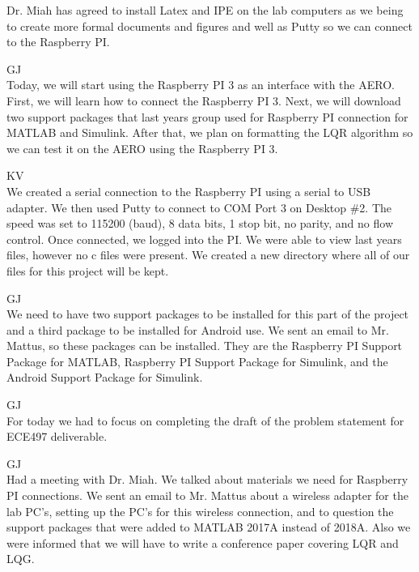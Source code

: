 \documentclass[fontsize=11pt, %
                             paper=letter, %
                             openany, %
                             captions=tableheading,
                             index=totoc,
                             hyperref]{labbook}
\begin{document}
\begin{addmargin}[0cm]{0cm}
Dr. Miah has agreed to install Latex and IPE on the lab computers as we being to create more formal documents and figures and well as Putty so we can connect to the Raspberry PI.  

GJ\\
Today, we will start using the Raspberry PI 3 as an interface with the AERO.  First, we will learn how to connect the Raspberry PI 3. Next, we will download two support packages that last years group used for Raspberry PI connection for MATLAB and Simulink.  After that, we plan on formatting the LQR algorithm so we can test it on the AERO using the Raspberry PI 3.

KV\\
We created a serial connection to the Raspberry PI using a serial to USB adapter.  We then used Putty to connect to COM Port 3 on Desktop \#2.  The speed was set to 115200 (baud), 8 data bits, 1 stop bit, no parity, and no flow control.  Once connected, we logged into the PI.  We were able to view last years files, however no c files were present.  We created a new directory where all of our files for this project will be kept.

GJ\\
We need to have two support packages to be installed for this part of the project and a third package to be installed for Android use.  We sent an email to Mr. Mattus, so these packages can be installed.  They are the Raspberry PI Support Package for MATLAB, Raspberry PI Support Package for Simulink, and the Android Support Package for Simulink.


GJ\\
For today we had to focus on completing the draft of the problem statement for ECE497 deliverable.


GJ\\
Had a meeting with Dr. Miah. We talked about materials we need for Raspberry PI connections.  We sent an email to Mr. Mattus about a wireless adapter for the lab PC's, setting up the PC's for this wireless connection, and to question the support packages that were added to MATLAB 2017A instead of 2018A.  Also we were informed that we will have to write a conference paper covering LQR and LQG.


\end{addmargin}
\end{document}
